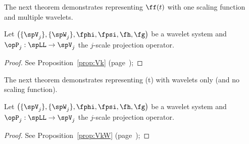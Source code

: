 The next theorem demonstrates
representing $\ff(t)$ with one scaling function and multiple wavelets.
\begin{theorem}
\label{thm_fx_vw}
Let $\left(\{\spV_j\},\{\spW_j\}, \fphi,\fpsi,\fh,\fg\right)$
be a wavelet system and
$\opP_j:\spLL\to\spV_j$ the $j$-scale projection operator.
\end{theorem}
\begin{proof}
See Proposition~\ref{prop:Vk} (page~\pageref{prop:Vk});
\end{proof}

The next theorem demonstrates
representing \ff(t) with wavelets only (and no scaling function).
\begin{theorem}
\label{thm_fx_w}
Let $\left(\{\spV_j\},\{\spW_j\}, \fphi,\fpsi,\fh,\fg\right)$
be a wavelet system and
$\opP_j:\spLL\to\spV_j$ the $j$-scale projection operator.
\end{theorem}
\begin{proof}
See Proposition~\ref{prop:VkW} (page~\pageref{prop:VkW});
\end{proof}



